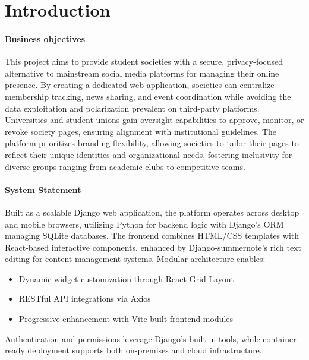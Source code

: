 \chapter{Introduction}
\label{chap:introduction}

\subsubsection{Business objectives}\label{business-objectives}

This project aims to provide student societies with a secure,
privacy-focused alternative to mainstream social media platforms for
managing their online presence. By creating a dedicated web application,
societies can centralize membership tracking, news sharing, and event
coordination while avoiding the data exploitation and polarization
prevalent on third-party platforms. Universities and student unions gain
oversight capabilities to approve, monitor, or revoke society pages,
ensuring alignment with institutional guidelines. The platform
prioritizes branding flexibility, allowing societies to tailor their
pages to reflect their unique identities and organizational needs,
fostering inclusivity for diverse groups ranging from academic clubs to
competitive teams.

\subsubsection{System Statement}\label{system-statement}

Built as a scalable Django web application, the platform operates 
across desktop and mobile browsers, utilizing Python for backend 
logic with Django's ORM managing SQLite databases. 
The frontend combines HTML/CSS templates with React-based interactive components, 
enhanced by Django-summernote's rich text editing for content management systems. 
Modular architecture enables:
\begin{itemize}
\item Dynamic widget customization through React Grid Layout
\item RESTful API integrations via Axios
\item Progressive enhancement with Vite-built frontend modules
\end{itemize}
Authentication and permissions leverage Django's built-in tools, while container-ready deployment supports both on-premises and cloud infrastructure.
